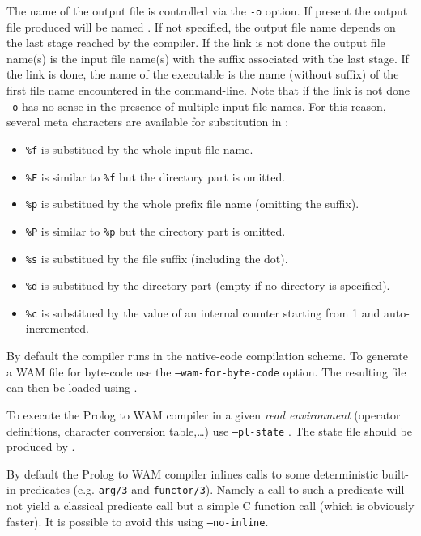 The name of the output file is controlled via the \texttt{-o}
 option. If present the output file produced will be
named . If not specified, the output file name depends on the
last stage reached by the compiler. If the link is not done the output file
name(s) is the input file name(s) with the suffix associated with the last
stage. If the link is done, the name of the executable is the name (without
suffix) of the first file name encountered in the command-line.  Note that if
the link is not done \texttt{-o} has no sense in the presence of multiple
input file names. For this reason, several meta characters are available for substitution in :

\begin{itemize}
\item \texttt{\%f} is substitued by the whole input file name.
\item \texttt{\%F} is similar to \texttt{\%f} but the directory part is omitted.
\item \texttt{\%p} is substitued by the whole prefix file name (omitting the suffix).
\item \texttt{\%P} is similar to \texttt{\%p} but the directory part is omitted.
\item \texttt{\%s} is substitued by the file suffix (including the dot).
\item \texttt{\%d} is substitued by the directory part (empty if no directory is specified).
\item \texttt{\%c} is substitued by the value of an internal counter starting from 1 and auto-incremented.
\end{itemize}

By default the compiler runs in the native-code compilation scheme. To
generate a WAM file for byte-code use the \texttt{--wam-for-byte-code}
option. The resulting file can then be loaded using 
.

To execute the Prolog to WAM compiler in a given \emph{read environment}
(operator definitions, character conversion table,\ldots) use
\texttt{--pl-state} . The state file should be
produced by 
.

By default the Prolog to WAM compiler inlines calls to some deterministic
built-in predicates (e.g. \texttt{arg/3} and \texttt{functor/3}). Namely a
call to such a predicate will not yield a classical predicate call but a
simple C function call (which is obviously faster). It is possible to avoid
this using \texttt{--no-inline}.

